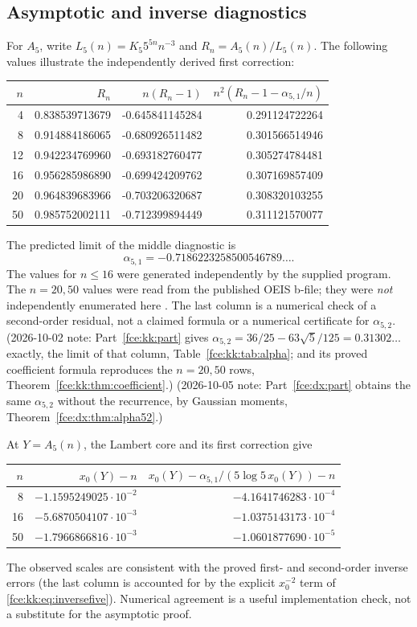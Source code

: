 \documentclass[11pt,a4paper]{article}
\numberwithin{equation}{section}
\theoremstyle{definition}\newtheorem{definition}[theorem]{Definition}
\theoremstyle{remark}\newtheorem{remark}[theorem]{Remark}
\begin{document}
\subsection{Asymptotic and inverse diagnostics}
For $A_5$, write
$L_5(n)=K_5 5^{5n}n^{-3}$ and $R_n=A_5(n)/L_5(n)$. The following values
illustrate the independently derived first correction:
\begin{center}
\begin{tabular}{rrrr}
\toprule
$n$&$R_n$&$n(R_n-1)$&$n^2(R_n-1-\alpha_{5,1}/n)$\\
\midrule
4&0.838539713679&-0.645841145284&0.291124722264\\
8&0.914884186065&-0.680926511482&0.301566514946\\
12&0.942234769960&-0.693182760477&0.305274784481\\
16&0.956285986890&-0.699424209762&0.307169857409\\
20&0.964839683966&-0.703206320687&0.308320103255\\
50&0.985752002111&-0.712399894449&0.311121570077\\
\bottomrule
\end{tabular}
\end{center}
The predicted limit of the middle diagnostic is
\[
 \alpha_{5,1}=-0.7186223258500546789\ldots.
\]
The values for $n\le16$ were generated independently by the supplied
program. The $n=20,50$ values were read from the published OEIS b-file;
they were \emph{not} independently enumerated here \cite{bfile5}.
The last column is a numerical check of a second-order residual, not a
claimed formula or a numerical certificate for $\alpha_{5,2}$.
(2026-10-02 note: Part~\ref{fce:kk:part} gives
$\alpha_{5,2}=36/25-63\sqrt5/125=0.31302\ldots$ exactly, the limit of that
column, Table~\ref{fce:kk:tab:alpha}; and its proved coefficient formula
reproduces the $n=20,50$ rows, Theorem~\ref{fce:kk:thm:coefficient}.)
(2026-10-05 note: Part~\ref{fce:dx:part} obtains the same $\alpha_{5,2}$ without the
recurrence, by Gaussian moments, Theorem~\ref{fce:dx:thm:alpha52}.)

At $Y=A_5(n)$, the Lambert core and its first correction give
\begin{center}
\begin{tabular}{rrr}
\toprule
$n$&$x_0(Y)-n$&$x_0(Y)-\alpha_{5,1}/(5\log5\,x_0(Y))-n$\\
\midrule
8&$-1.1595249025\cdot10^{-2}$&$-4.1641746283\cdot10^{-4}$\\
16&$-5.6870504107\cdot10^{-3}$&$-1.0375143173\cdot10^{-4}$\\
50&$-1.7966866816\cdot10^{-3}$&$-1.0601877690\cdot10^{-5}$\\
\bottomrule
\end{tabular}
\end{center}
The observed scales are consistent with the proved first- and second-order
inverse errors (the last column is accounted for by the explicit
$x_0^{-2}$ term of \eqref{fce:kk:eq:inversefive}). Numerical agreement is a useful implementation check,
not a substitute for the asymptotic proof.
\end{document}
